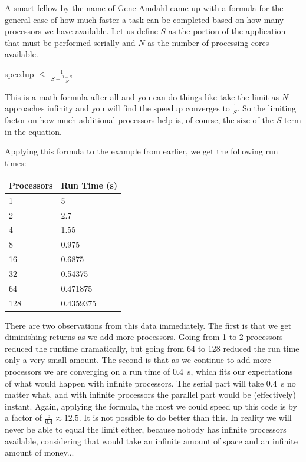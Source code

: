 A smart fellow by the name of Gene Amdahl came up with a formula for the general case of how much faster a task can be completed based on how many processors we have available. Let us define $S$ as the portion of the application that must be performed serially and $N$ as the number of processing cores available.

\begin{center}
speedup $\leq$ {\huge $\frac{1}{S + \frac{1-S}{N}}$}
\end{center}

This is a math formula after all and you can do things like take the limit as $N$ approaches infinity and you will find the speedup converges to $\frac{1}{S}$. So the limiting factor on how much additional processors help is, of course, the size of the $S$ term in the equation.

Applying this formula to the example from earlier, we get the following run times:

\begin{center}
	\begin{tabular}{l|l}
	\textbf{Processors} & \textbf{Run Time (s)} \\ \hline
	1 & 5\\
	2 & 2.7\\
	4 & 1.55\\
	8 & 0.975\\
	16 & 0.6875 \\
	32 & 0.54375 \\
	64 & 0.471875 \\
	128 & 0.4359375\\
	\end{tabular}
\end{center}

There are two observations from this data immediately. The first is that we get diminishing returns as we add more processors. Going from 1 to 2 processors reduced the runtime dramatically, but going from 64 to 128 reduced the run time only a very small amount. The second is that as we continue to add more processors we are converging on a run time of 0.4~s, which fits our expectations of what would happen with infinite processors. The serial part will take 0.4~s no matter what, and with infinite processors the parallel part would be (effectively) instant. Again, applying the formula, the most we could speed up this code is by a factor of $\frac{5}{0.4}\approx 12.5$. It is not possible to do better than this. In reality we will never be able to equal the limit either, because nobody has infinite processors available, considering that would take an infinite amount of space and an infinite amount of money...





